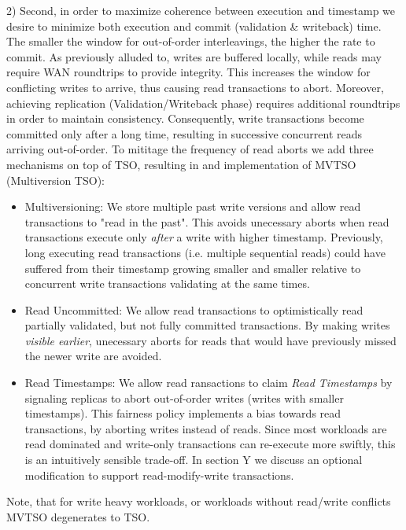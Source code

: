 2) Second, in order to maximize coherence between execution and timestamp we desire to minimize both execution and commit (validation \& writeback) time. The smaller the window for out-of-order interleavings, the higher the rate to commit. As previously alluded to, writes are buffered locally, while reads may require WAN roundtrips to provide integrity. This increases the window for conflicting writes to arrive, thus causing read transactions to abort.
Moreover, achieving replication (Validation/Writeback phase) requires additional roundtrips in order to maintain consistency. Consequently, write transactions become committed only after a long time, resulting in successive concurrent reads arriving out-of-order.
To mititage the frequency of read aborts we add three mechanisms on top of TSO, resulting in and implementation of MVTSO (Multiversion TSO):
\begin{itemize}
\item Multiversioning: We store multiple past write versions and allow read transactions to "read in the past". This avoids unecessary aborts when read transactions execute only \textit{after} a write with higher timestamp. Previously, long executing read transactions (i.e. multiple sequential reads) could have suffered from their timestamp growing smaller and smaller relative to concurrent write transactions validating at the same times.
\item Read Uncommitted: We allow read transactions to optimistically read partially validated, but not fully committed transactions. By making writes \textit{visible earlier}, unecessary aborts for reads that would have previously missed the newer write are avoided.
\item Read Timestamps: We allow read ransactions to claim \textit{Read Timestamps} by signaling replicas to abort out-of-order writes (writes with smaller timestamps). This fairness policy implements a bias towards read transactions, by aborting writes instead of reads. Since most workloads are read dominated and write-only transactions can re-execute more swiftly, this is an intuitively sensible trade-off. In section Y we discuss an optional modification to support read-modify-write transactions. 
\end{itemize}


Note, that for write heavy workloads, or workloads without read/write conflicts MVTSO degenerates to TSO.

